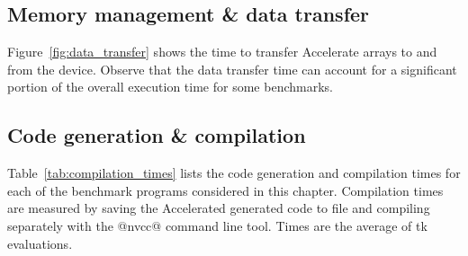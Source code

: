 \subsection{Memory management \& data transfer}

Figure~\ref{fig:data_transfer} shows the time to transfer Accelerate arrays to
and from the device. Observe that the data transfer time can account for a
significant portion of the overall execution time for some benchmarks.


\subsection{Code generation \& compilation}

Table~\ref{tab:compilation_times} lists the code generation and compilation
times for each of the benchmark programs considered in this chapter. Compilation
times are measured by saving the Accelerated generated code to file and
compiling separately with the @nvcc@ command line tool. Times are the average of
tk evaluations.

